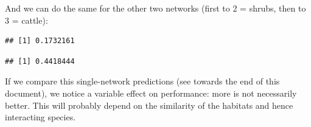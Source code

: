 \documentclass[a4paper, 11pt]{article}\usepackage[]{graphicx}\usepackage[]{color}
\makeatletter
\newenvironment{kframe}{%
 \def\at@end@of@kframe{}%
 \ifinner\ifhmode%
  \def\at@end@of@kframe{\end{minipage}}%
  \begin{minipage}{\columnwidth}%
 \fi\fi%
 \def\FrameCommand##1{\hskip\@totalleftmargin \hskip-\fboxsep
 \colorbox{shadecolor}{##1}\hskip-\fboxsep
     \hskip-\linewidth \hskip-\@totalleftmargin \hskip\columnwidth}%
 \MakeFramed {\advance\hsize-\width
   \@totalleftmargin\z@ \linewidth\hsize
   \@setminipage}}%
 {\par\unskip\endMakeFramed%
 \at@end@of@kframe}
\newenvironment{knitrout}{}{} %
\makeatother
\begin{document}
And we can do the same for the other two networks (first to 2 = shrubs, then to 3 = cattle):
\begin{knitrout}\small
{}\color{fgcolor}\begin{kframe}
\begin{verbatim}
## [1] 0.1732161
\end{verbatim}
\end{kframe}
\end{knitrout}
\begin{knitrout}\small
{}\color{fgcolor}\begin{kframe}
\begin{verbatim}
## [1] 0.4418444
\end{verbatim}
\end{kframe}
\end{knitrout}
If we compare this single-network predictions (see towards the end of this document), we notice a variable effect on performance: more is not necessarily better. This will probably depend on the similarity of the habitats and hence interacting species.
\end{document}
